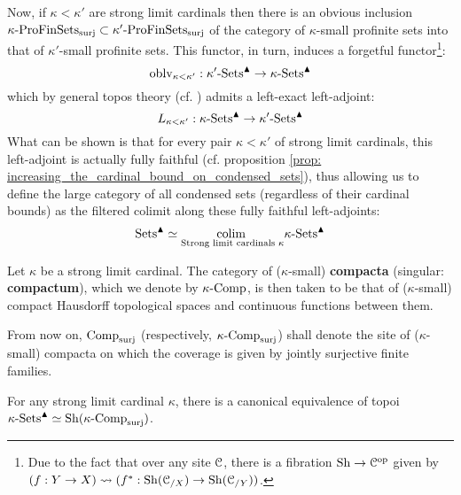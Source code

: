 \begin{remark}
                Now, if $\kappa < \kappa'$ are strong limit cardinals then there is an obvious inclusion $\kappa\text{-}\mathrm{Pro}\mathrm{Fin}\mathrm{Sets}_{\mathrm{surj}} \subset \kappa'\text{-}\mathrm{Pro}\mathrm{Fin}\mathrm{Sets}_{\mathrm{surj}}$ of the category of $\kappa$-small profinite sets into that of $\kappa'$-small profinite sets. This functor, in turn, induces a forgetful functor\footnote{Due to the fact that over any site $\mathcal{C}$, there is a fibration $\mathrm{Sh} \to \mathcal{C}^{\mathrm{op}}$ given by $(f: Y \to X) \leadsto (f^*: \mathrm{Sh}({\mathcal{C}_{/X}}) \to \mathrm{Sh}(\mathcal{C}_{/Y}))$.}:
                    $$\mathrm{oblv}_{\kappa < \kappa'}: \kappa'\text{-}\mathrm{Sets}^{\blacktriangle} \to \kappa\text{-}\mathrm{Sets}^{\blacktriangle}$$
                which by general topos theory (cf. \cite[Expos\'e IV]{sga4}) admits a left-exact left-adjoint:
                    $$L_{\kappa < \kappa'}: \kappa\text{-}\mathrm{Sets}^{\blacktriangle} \to \kappa'\text{-}\mathrm{Sets}^{\blacktriangle}$$
                What can be shown is that for every pair $\kappa < \kappa'$ of strong limit cardinals, this left-adjoint is actually fully faithful (cf. proposition \ref{prop: increasing_the_cardinal_bound_on_condensed_sets}), thus allowing us to define the large category of all condensed sets (regardless of their cardinal bounds) as the filtered colimit along these fully faithful left-adjoints:
                    $$\mathrm{Sets}^{\blacktriangle} \simeq \underset{ \text{Strong limit cardinals $\kappa$} }{\operatorname{colim} \:} \kappa\text{-}\mathrm{Sets}^{\blacktriangle}$$
            \end{remark}
            \begin{definition}[Compacta] \label{def: compacta}
                Let $\kappa$ be a strong limit cardinal. The category of ($\kappa$-small) \textbf{compacta} (singular: \textbf{compactum}), which we denote by $\kappa\text{-}\mathrm{Comp}$, is then taken to be that of ($\kappa$-small) compact Hausdorff topological spaces and continuous functions between them. 
            \end{definition}
            \begin{convention} \label{conv: site_of_compacta}
                From now on, $\mathrm{Comp}_{\mathrm{surj}}$ (respectively, $\kappa\text{-}\mathrm{Comp}_{\mathrm{surj}}$) shall denote the site of ($\kappa$-small) compacta on which the coverage is given by jointly surjective finite families.
            \end{convention}
            \begin{lemma} \label{lemma: condensed_sets_as_sheaves_on_compacta}
                For any strong limit cardinal $\kappa$, there is a canonical equivalence of topoi $\kappa\text{-}\mathrm{Sets}^{\blacktriangle} \simeq \mathrm{Sh}(\kappa\text{-}\mathrm{Comp}_{\mathrm{surj}})$.
            \end{lemma}
